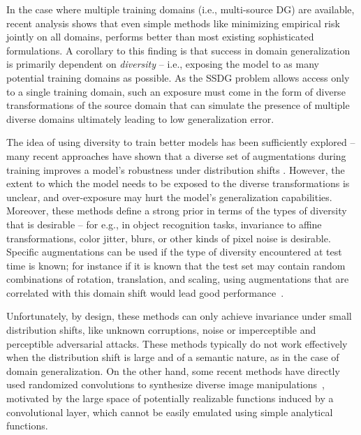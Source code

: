In the case where multiple training domains (i.e., multi-source DG) are available, recent analysis \citep{gulrajani2021in} shows that even simple methods like minimizing empirical risk jointly on all domains, performs better than most existing sophisticated formulations.
A corollary to this finding is that success in 
domain generalization is primarily dependent on \emph{diversity} -- i.e., exposing the model to as many potential training domains as possible.
As the SSDG problem allows access only to a single training domain, such an exposure must come in the form of diverse transformations of the source domain that can simulate the presence of multiple diverse domains ultimately leading to low generalization error. 

The idea of using diversity to train better models has been sufficiently explored -- many recent approaches have shown that a diverse set of augmentations during training improves a model's robustness under distribution shifts \citep{hendrycks2019augmix,yun2019cutmix,zhang2018mixup,cubuk2020randaugment}. 
However, the extent to which the model needs to be exposed to the diverse transformations is unclear, and over-exposure may hurt the model's generalization capabilities. 
Moreover, these methods define a strong prior in terms of the types of diversity that is desirable -- for e.g., in object recognition tasks, invariance to affine transformations, color jitter, blurs, or other kinds of pixel noise is desirable. 
Specific augmentations can be used if the type of diversity encountered at test time is known; for instance if it is known that the test set may contain random combinations of rotation, translation, and scaling, using augmentations that are correlated with this domain shift would lead good performance~\citep{gokhale2021attribute,benton2020learning,wong2020learning}.

Unfortunately, by design, these methods can only achieve invariance under small distribution shifts, like unknown corruptions, noise or imperceptible and perceptible adversarial attacks. 
These methods typically do not work effectively when the distribution shift is large and of a semantic nature, as in the case of domain generalization. 
On the other hand, some recent methods have directly used randomized convolutions to synthesize diverse image manipulations~\citep{xu2020robust}, motivated by the large space of potentially realizable functions induced by a convolutional layer, which cannot be easily emulated using simple analytical functions. 
 
